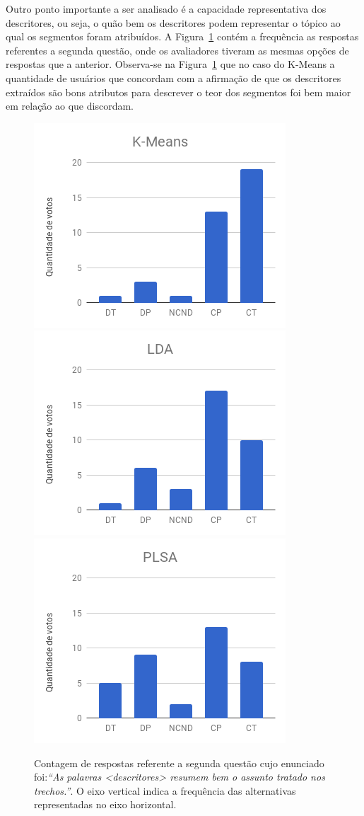 Outro ponto importante a ser analisado é a capacidade representativa dos descritores, ou seja, o quão bem os descritores podem representar o tópico ao qual os segmentos foram atribuídos. A Figura~\ref{fig:Q2} contém a frequência as respostas referentes a segunda questão, 
onde os avaliadores tiveram as mesmas opções de respostas que a anterior. Observa-se na Figura~\ref{fig:Q2} que no caso do K-Means a quantidade de usuários que concordam com a afirmação de que os descritores extraídos são bons atributos para descrever o teor dos segmentos foi bem maior em relação ao que discordam.

\begin{figure}[!h] \centering     %

		\includegraphics[width=.31\textwidth]{conteudo/capitulos/figs/figuras-experimento/Q2-KMeans.png}
		\includegraphics[width=.31\textwidth]{conteudo/capitulos/figs/figuras-experimento/Q2-LDA.png}
		\includegraphics[width=.31\textwidth]{conteudo/capitulos/figs/figuras-experimento/Q2-PLSA.png}
	\caption{Contagem de respostas referente a segunda questão cujo enunciado foi:\textit{``As palavras \textit{<descritores>} resumem bem o assunto tratado nos trechos.''}. O eixo vertical indica a frequência das alternativas representadas no eixo horizontal. }
	\label{fig:Q2}
\end{figure}


